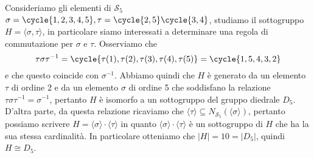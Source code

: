 \documentclass[11pt]{scrartcl}
\begin{document}
	Consideriamo gli elementi di $\mathcal{S}_5$ $\sigma = \cycle{1, 2, 3, 4, 5}, 
	\tau = \cycle{2, 5}\cycle{3, 4}$, studiamo il sottogruppo $H = \langle\sigma, \tau\rangle$,
	in particolare siamo interessati a determinare una regola di commutazione
	per $\sigma$ e $\tau$. Osserviamo che 
	\[
	\tau\sigma\tau^{-1} = \cycle{\tau(1), \tau(2), \tau(3), \tau(4), \tau(5)} = 
	\cycle{1, 5, 4, 3, 2}
	\]
	e che questo coincide con $\sigma^{-1}$. Abbiamo quindi che $H$ è generato 
	da un elemento $\tau$ di ordine 2 e da un elemento $\sigma$ di ordine 5 
	che soddisfano la relazione $\tau\sigma\tau^{-1} = \sigma^{-1}$, pertanto 
	$H$ è isomorfo a un sottogruppo del gruppo diedrale $D_5$. D'altra parte, 
	da questa relazione ricaviamo che $\langle \tau\rangle \subseteq N_{\mathcal{S}_5}(\langle\sigma\rangle)$,
	pertanto possiamo scrivere $H = \langle\sigma\rangle\cdot\langle\tau\rangle$
	in quanto $\langle\sigma\rangle\cdot\langle\tau\rangle$ è un sottogruppo di $H$
	che ha la sua stessa cardinalità. In particolare otteniamo che $|H| = 10 = |D_5|$,
	quindi $H \cong D_5$.\\
	
	
\end{document}

